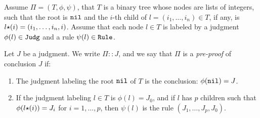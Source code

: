 

\begin{definition}
Assume $\Pi=(T,\phi, \psi)$, that $T$ is a binary tree whose nodes are lists of integers, such
that the root is ${\tt nil}$ and the $i$-th child of $l = ( i_1, \ldots, i_n ) \in T$, if any, 
is $l {\star} (i) = ( i_1, \ldots, i_n, i)$.
Assume that each node $l \in T$
is labeled by a judgment $\phi(l) \in {\tt Judg}$ and a rule $\psi(l) \in {\tt Rule}$. 

Let $J$ be a judgment. 
We write $\Pi :: J$, and we say that $\Pi$ is a \emph{pre-proof} of conclusion $J$ if:
\begin{enumerate}
\item 
  The judgment labeling the root ${\tt nil}$ of $T$ is the conclusion: $\phi({\tt nil}) = J$.
\item
  If the judgment labeling $l \in T$ is $\phi(l) = J_0$, and if $l$ has $p$ children
  such that $\phi(l {\star} (i)) = J_i$ for $i=1, \ldots, p$,
  then $\psi(l)$ is the rule $(J_1,\ldots,J_p,J_0)$.
\end{enumerate}
\end{definition}

%
%

